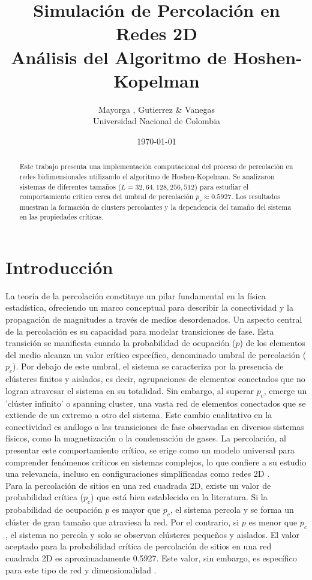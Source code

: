 \documentclass[12pt,a4paper]{article}
\title{Simulación de Percolación en Redes 2D\\
       Análisis del Algoritmo de Hoshen-Kopelman}
\author{Mayorga , Gutierrez \& Vanegas\\
        Universidad Nacional de Colombia}
\date{\today}
\begin{document}
\maketitle

\begin{abstract}
Este trabajo presenta una implementación computacional del proceso de percolación en redes bidimensionales utilizando el algoritmo de Hoshen-Kopelman. Se analizaron sistemas de diferentes tamaños ($L = 32, 64, 128, 256, 512$) para estudiar el comportamiento crítico cerca del umbral de percolación $p_c \approx 0.5927$. Los resultados muestran la formación de clusters percolantes y la dependencia del tamaño del sistema en las propiedades críticas.
\end{abstract}

\section{Introducción}

La teoría de la percolación constituye un pilar fundamental en la física estadística, ofreciendo un marco conceptual para describir la conectividad y la propagación de magnitudes a través de medios desordenados. Un aspecto central de la percolación es su capacidad para modelar transiciones de fase. Esta transición se manifiesta cuando la probabilidad de ocupación ($p$) de los elementos del medio alcanza un valor crítico específico, denominado umbral de percolación ($p_c$). Por debajo de este umbral, el sistema se caracteriza por la presencia de clústeres finitos y aislados, es decir, agrupaciones de elementos conectados que no logran atravesar el sistema en su totalidad. Sin embargo, al superar $p_c$, emerge un 'clúster infinito' o spanning cluster, una vasta red de elementos conectados que se extiende de un extremo a otro del sistema. Este cambio cualitativo en la conectividad es análogo a las transiciones de fase observadas en diversos sistemas físicos, como la magnetización o la condensación de gases. La percolación, al presentar este comportamiento crítico, se erige como un modelo universal para comprender fenómenos críticos en sistemas complejos, lo que confiere a su estudio una relevancia, incluso en configuraciones simplificadas como redes 2D \cite{CantabranaBarrio2018} \cite{PERCentralPercolation}.
\\

Para la percolación de sitios en una red cuadrada 2D, existe un valor de probabilidad crítica ($p_c$) que está bien establecido en la literatura. Si la probabilidad de ocupación $p$ es mayor que $p_c$, el sistema percola y se forma un clúster de gran tamaño que atraviesa la red. Por el contrario, si $p$ es menor que $p_c$, el sistema no percola y solo se observan clústeres pequeños y aislados. El valor aceptado para la probabilidad crítica de percolación de sitios en una red cuadrada 2D es aproximadamente 0.5927. Este valor, sin embargo, es específico para este tipo de red y dimensionalidad \cite{PERCentralPercolation}.
\\
\end{document}
